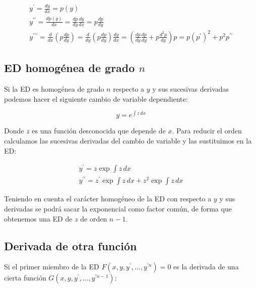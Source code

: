 \documentclass[a4paper,12pt,titlepage]{article}
\begin{document}
\begin{equation*}
    \begin{gathered}
        y^\prime = \frac{dy}{dx} = p(y) \\
        y^{\prime \prime} = \frac{dp(y)}{dx} = \frac{dp}{dy} \frac{dy}{dx} = p \frac{dp}{dy} \\
        y^{\prime \prime \prime} = \frac{d}{dx}\left (p\frac{dp}{dy}\right ) = \frac{d}{dy} \left (p\frac{dp}{dy}\right ) \frac{dy}{dx} = \left (\frac{dp}{dy}\frac{dp}{dy} + p \frac{d^2p}{dy}\right )p = p(p^\prime)^2+p^2p^{\prime \prime}
    \end{gathered}
\end{equation*}

\subsection{ED homogénea de grado $n$}

Si la ED es homogénea de grado $n$ respecto a $y$ y sus sucesivas derivadas podemos hacer el siguiente cambio de variable dependiente:

\begin{equation*}
    y = e^{\int z \,dx}
\end{equation*}

Donde $z$ es una función desconocida que depende de $x$. Para reducir el orden calculamos las sucesivas derivadas del cambio de variable y las sustituimos en la ED:

\begin{equation*}
    \begin{gathered}
        y^\prime = z \exp \int z \, dx \\
        y^{\prime \prime} = z^{\prime} \exp \int z\,dx + z^2 \exp \int z\,dx
    \end{gathered}
\end{equation*}

Teniendo en cuenta el carácter homogéneo de la ED con respecto a $y$ y sus derivadas se podrá sacar la exponencial como factor común, de forma que obtenemos una ED de $z$ de orden $n-1$.

\newpage

\subsection{Derivada de otra función}

Si el primer miembro de la ED $F(x,y,y^\prime,...,y^{\prime n})=0$ es la derivada de una cierta función $G(x,y,y^\prime,...,y^{\prime n-1})$:
\end{document}
